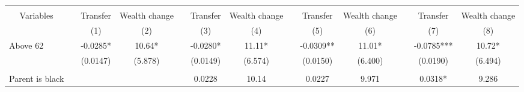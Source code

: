 \begin{tabular}{rrrrrrrrrrrrr}
\toprule
          &           &           &           &           &           &           &           &           &           &           &           &  \\
\cmidrule{1-1}\cmidrule{3-4}\cmidrule{6-7}\cmidrule{9-10}\cmidrule{12-13}\multicolumn{1}{c}{\multirow{2}[2]{*}{Variables}} &           & \multicolumn{1}{c}{\multirow{2}[2]{*}{Transfer }} & \multicolumn{1}{c}{\multirow{2}[2]{*}{Wealth change}} &           & \multicolumn{1}{c}{\multirow{2}[2]{*}{Transfer }} & \multicolumn{1}{c}{\multirow{2}[2]{*}{Wealth change}} &           & \multicolumn{1}{c}{\multirow{2}[2]{*}{Transfer }} & \multicolumn{1}{c}{\multirow{2}[2]{*}{Wealth change}} &           & \multicolumn{1}{c}{\multirow{2}[2]{*}{Transfer }} & \multicolumn{1}{c}{\multirow{2}[2]{*}{Wealth change}} \\
          &           &           &           &           &           &           &           &           &           &           &           &  \\
\cmidrule{1-1}\cmidrule{3-4}\cmidrule{6-7}\cmidrule{9-10}\cmidrule{12-13}          &           & \multicolumn{1}{c}{(1)} & \multicolumn{1}{c}{(2)} &           & \multicolumn{1}{c}{(3)} & \multicolumn{1}{c}{(4)} &           & \multicolumn{1}{c}{(5)} & \multicolumn{1}{c}{(6)} &           & \multicolumn{1}{c}{(7)} & \multicolumn{1}{c}{(8)} \\
\multicolumn{1}{l}{Above 62} &           & \multicolumn{1}{c}{-0.0285*} & \multicolumn{1}{c}{10.64*} &           & \multicolumn{1}{c}{-0.0280*} & \multicolumn{1}{c}{11.11*} &           & \multicolumn{1}{c}{-0.0309**} & \multicolumn{1}{c}{11.01*} &           & \multicolumn{1}{c}{-0.0785***} & \multicolumn{1}{c}{10.72*} \\
          &           & \multicolumn{1}{c}{(0.0147)} & \multicolumn{1}{c}{(5.878)} &           & \multicolumn{1}{c}{(0.0149)} & \multicolumn{1}{c}{(6.574)} &           & \multicolumn{1}{c}{(0.0150)} & \multicolumn{1}{c}{(6.400)} &           & \multicolumn{1}{c}{(0.0190)} & \multicolumn{1}{c}{(6.494)} \\
          &           &           &           &           &           &           &           &           &           &           &           &  \\
\multicolumn{1}{l}{Parent is black} &           & \multicolumn{1}{c}{} & \multicolumn{1}{c}{} &           & \multicolumn{1}{c}{0.0228} & \multicolumn{1}{c}{10.14} &           & \multicolumn{1}{c}{0.0227} & \multicolumn{1}{c}{9.971} &           & \multicolumn{1}{c}{0.0318*} & \multicolumn{1}{c}{9.286} \\

\end{tabular}
